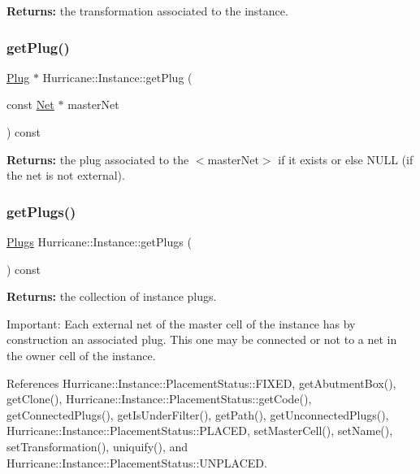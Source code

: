 {\bfseries Returns\+:} the transformation associated to the instance. \mbox{\label{classHurricane_1_1Instance_a1afe07edc0374ddfb505b4973c902834}} 
\subsubsection{\texorpdfstring{get\+Plug()}{getPlug()}}
{\footnotesize\ttfamily \hyperlink{classHurricane_1_1Plug}{Plug} $\ast$ Hurricane\+::\+Instance\+::get\+Plug (\begin{DoxyParamCaption}\item[{const \hyperlink{classHurricane_1_1Net}{Net} $\ast$}]{master\+Net }\end{DoxyParamCaption}) const\hspace{0.3cm}{\ttfamily [inline]}}

{\bfseries Returns\+:} the plug associated to the {\ttfamily $<$master\+Net$>$} if it exists or else N\+U\+LL (if the net is not external). \mbox{\label{classHurricane_1_1Instance_a5433b64eed99f9a099004490fae6d8f4}} 
\subsubsection{\texorpdfstring{get\+Plugs()}{getPlugs()}}
{\footnotesize\ttfamily \hyperlink{namespaceHurricane_ac8335d2057483ee7a935c15a9460c64f}{Plugs} Hurricane\+::\+Instance\+::get\+Plugs (\begin{DoxyParamCaption}{ }\end{DoxyParamCaption}) const\hspace{0.3cm}{\ttfamily [inline]}}

{\bfseries Returns\+:} the collection of instance plugs.

\begin{DoxyParagraph}{Important\+:}
Each external net of the master cell of the instance has by construction an associated plug. This one may be connected or not to a net in the owner cell of the instance. 
\end{DoxyParagraph}


References Hurricane\+::\+Instance\+::\+Placement\+Status\+::\+F\+I\+X\+ED, get\+Abutment\+Box(), get\+Clone(), Hurricane\+::\+Instance\+::\+Placement\+Status\+::get\+Code(), get\+Connected\+Plugs(), get\+Is\+Under\+Filter(), get\+Path(), get\+Unconnected\+Plugs(), Hurricane\+::\+Instance\+::\+Placement\+Status\+::\+P\+L\+A\+C\+ED, set\+Master\+Cell(), set\+Name(), set\+Transformation(), uniquify(), and Hurricane\+::\+Instance\+::\+Placement\+Status\+::\+U\+N\+P\+L\+A\+C\+ED.

